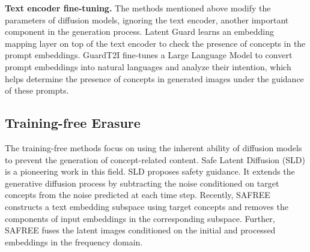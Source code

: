 \textbf{Text encoder fine-tuning.} The methods mentioned above modify the parameters of diffusion models, ignoring the text encoder, another important component in the generation process. Latent Guard \cite{liu2025latent} learns an embedding mapping layer on top of the text encoder to check the presence of concepts in the prompt embeddings. GuardT2I \cite{yang2024guardt2i} fine-tunes a Large Language Model to convert prompt embeddings into natural languages and analyze their intention, which helps determine the presence of concepts in generated images under the guidance of these prompts.



\subsection{Training-free Erasure}

The training-free methods focus on using the inherent ability of diffusion models to prevent the generation of concept-related content. Safe Latent Diffusion (SLD) \cite{schramowski2023safe} is a pioneering work in this field. SLD proposes safety guidance. It extends the generative diffusion process by subtracting the noise conditioned on target concepts from the noise predicted at each time step. Recently, SAFREE \cite{yoon2024safree} constructs a text embedding subspace using target concepts and removes the components of input embeddings in the corresponding subspace. Further, SAFREE fuses the latent images conditioned on the initial and processed embeddings in the frequency domain.